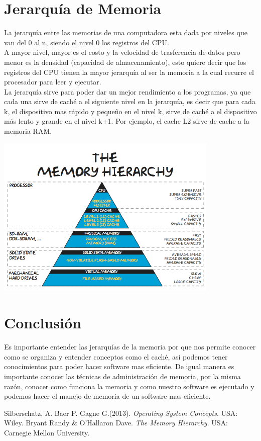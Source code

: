 \documentclass[spanish,12pt,letterpapper]{article}
\begin{document}
	\pagebreak
	\section{Jerarquía de Memoria}
	La jerarquía entre las memorias de una computadora esta dada por niveles que van del 0 al n, siendo el nivel 0 los registros del CPU.\\
	
	A mayor nivel, mayor es el costo y la velocidad de trasferencia de datos pero menor es la densidad (capacidad de almacenamiento), esto quiere decir que los registros del CPU tienen la mayor jerarquía al ser la memoria a la cual recurre el procesador para leer y ejecutar.\\
	
	La jerarquía sirve para poder dar un mejor rendimiento a los programas, ya que cada una sirve de caché a el siguiente nivel en la jerarquía, es decir que para cada k, el dispositivo mas rápido y pequeño en el nivel k, sirve de caché a el dispositivo más lento y grande en el nivel k+1. Por ejemplo, el cache L2 sirve de cache a la memoria RAM.\\
	
	\begin{center}
	\includegraphics[width=0.8\textwidth]{./memh}~\\[1cm] 
	\end{center}
	
	\section{Conclusión}
	Es importante entender las jerarquías de la memoria por que nos permite conocer como se organiza y entender conceptos como el caché, así podemos tener conocimientos para poder hacer software mas eficiente. De igual manera es importante conocer las técnicas de administración de memoria, por la misma razón, conocer como funciona la memoria y como nuestro software es ejecutado y podemos hacer el manejo de memoria de un software mas eficiente. 
	
	\pagebreak
	\begin{thebibliography}{9}
		 Silberschatz, A. Baer P. Gagne G.(2013).
		\emph{Operating System Concepts}. USA: Wiley.
		 Bryant Randy \& O’Hallaron Dave.
		\emph{The Memory Hierarchy}. USA: Carnegie Mellon University.
	\end{thebibliography}
	
\end{document}
